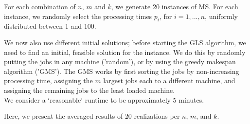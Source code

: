 \documentclass[12pt,a4paper,reqno]{article}
\begin{document}
For each combination of $n$, $m$ and $k$, we generate 20 instances of MS. For each instance, we randomly select the processing times $p_i$, for $i=1,...,n$, uniformly distributed between 1 and 100. 


We now also use different initial solutions; before starting the GLS algorithm, we need to find an initial, feasible solution for the instance. We do this by randomly putting the jobs in any machine ('random'), or by using the greedy makespan algorithm ('GMS'). The GMS works by first sorting the jobs by non-increasing processing time, assigning the $m$ largest jobs each to a different machine, and assigning the remaining jobs to the least loaded machine. \\

We consider a `reasonable' runtime to be approximately 5 minutes.

Here, we present the averaged results of 20 realizations per $n$, $m$, and $k$. \\
\end{document}

